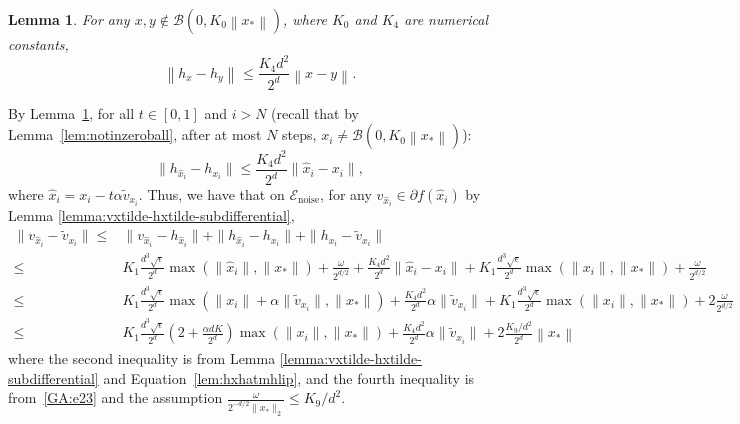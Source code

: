\documentclass[11pt]{article}
\newtheorem{lemma}[theorem]{Lemma}
\newcommand{\xo}{x_\ast}
\newcommand{\Tnorm}{}
\newcommand\norm[2][\Tnorm]{\ensuremath{{\left\|#2\right\|}_{#1}}}
\newcommand\eventnoisesmall{\mathcal E_{\text{noise}}}
\newcommand\stepdir[1]{\tilde v_{#1}}
\newcommand\ball{\mathcal B}
\begin{document}
\begin{lemma}
\label{lemma:h-lipschitz}
For any $x, y \notin \ball(0, K_0 \norm{\xo})$, where $K_0$ and $K_4$ are numerical constants,
\[
\norm{h_{x} - h_{y}}
\leq \frac{K_4d^2}{2^d} \norm{x-y}.
\]
\end{lemma}
By Lemma~\ref{lemma:h-lipschitz}, for all $t \in [0, 1]$ and $i > N$  (recall that by Lemma~\ref{lem:notinzeroball}, after at most $N$ steps, $x_i \neq \ball (0, K_0 \norm{\xo})$):
\begin{equation}
\label{lem:hxhatmhlip}
\|h_{\hat{x}_{i}} - h_{x_{i}}\| \leq \frac{K_4d^2}{2^d} \|\hat{x}_{i} - x_{i}\|,
\end{equation}
where $\hat{x}_{i} = x_{i} - t \alpha \stepdir{x_i}$.
Thus, we have that on $\eventnoisesmall$, for any $v_{\hat{x}_{i}} \in \partial f(\hat{x}_{i}) $  by Lemma \ref{lemma:vxtilde-hxtilde-subdifferential},
\begin{align}
\|v_{\hat{x}_{i}} - \stepdir{x_i}\|
%
\leq&
\|v_{\hat{x}_{i}} - h_{\hat{x}_{i}}\| + \|h_{\hat{x}_{i}} - h_{x_{i}}\| + \|h_{x_{i}} - \stepdir{x_i}\| \nonumber \\
%
\leq&
K_1 \frac{d^3 \sqrt{\epsilon}}{2^d} \max(\|\hat{x}_{i}\|, \|x_*\|) + \frac{\omega}{2^{d/2}} + \frac{K_4d^2}{2^d} \|\hat{x}_{i} - x_{i}\| + K_1 \frac{d^3 \sqrt{\epsilon}}{2^d} \max(\|x_{i}\|, \|x_*\|) + \frac{\omega}{2^{d/2}} \nonumber \\
%
\leq&
K_1 \frac{d^3 \sqrt{\epsilon}}{2^d} \max(\|x_{i}\| + \alpha \|\stepdir{x_i}\|, \|x_*\|) + \frac{K_4d^2}{2^d} \alpha \|\stepdir{x_i}\| + K_1 \frac{d^3 \sqrt{\epsilon}}{2^d} \max(\|x_{i}\|, \|x_*\|) + 2\frac{\omega}{2^{d/2}}  \nonumber \\
\leq&
K_1 \frac{d^3 \sqrt{\epsilon}}{2^d} \left(2 + \frac{\alpha d K}{2^d}  \right) \max(\|x_{i}\|, \|x_*\|) + \frac{K_4d^2}{2^d} \alpha \|\stepdir{x_i}\| + 2\frac{K_9/d^2}{2^{d}} \norm{\xo} \label{eta-minus-vtilde}
\end{align}
where the second inequality is from Lemma \ref{lemma:vxtilde-hxtilde-subdifferential} and Equation~\eqref{lem:hxhatmhlip},
and the fourth inequality is from~\eqref{GA:e23}
and the assumption $\frac{ \omega }{2^{-d/2} \|\xo\|_2} \leq K_9 / d^2$.
\end{document}
